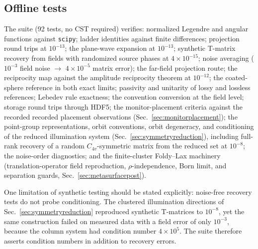 \documentclass[11pt]{article}
\begin{document}
\subsection{Offline tests}
The suite (92 tests, no CST required) verifies: normalized Legendre and
angular functions against \texttt{scipy}; ladder identities against
finite differences; projection round trips at $10^{-13}$; the plane-wave
expansion at $10^{-13}$; synthetic T-matrix recovery from fields with
randomized source phases at $4\times 10^{-15}$; noise averaging
($10^{-3}$ field noise $\to$ $4\times 10^{-5}$ matrix error); the far-field
projection route; the reciprocity map against the amplitude reciprocity
theorem at $10^{-12}$; the coated-sphere reference in both exact limits;
passivity and unitarity of lossy and lossless references; Lebedev rule
exactness; the convention conversion at the field level; storage round
trips through HDF5; the monitor-placement criteria against the recorded
recorded placement observations (Sec.~\ref{sec:monitorplacement}); the
point-group representations, orbit conventions, orbit degeneracy, and
conditioning of the reduced illumination system
(Sec.~\ref{sec:symmetryreduction}), including full-rank recovery of a
random $C_{4v}$-symmetric matrix from the reduced set at $10^{-8}$; the
noise-order diagnostics; and the finite-cluster Foldy--Lax machinery
(translation-operator field reproduction, $\rho$-independence, Born
limit, and separation guards, Sec.~\ref{sec:metasurfacepost}).

One limitation of synthetic testing should be stated explicitly:
noise-free recovery tests do not probe conditioning.  The clustered
illumination directions of Sec.~\ref{sec:symmetryreduction} reproduced
synthetic T-matrices to $10^{-8}$, yet the same construction failed on
measured data with a field error of only $10^{-3}$, because the column
system had condition number $4\times10^{5}$.  The suite therefore
asserts condition numbers in addition to recovery errors.
\end{document}
